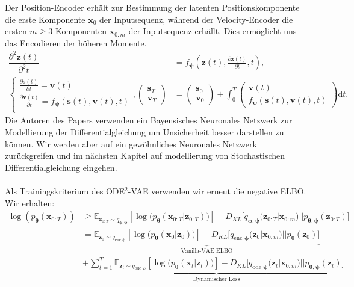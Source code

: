 \documentclass[12pt]{article}
\newcommand{\E}{\mathbb{E}}
\begin{document}
	Der Position-Encoder erhält zur Bestimmung der latenten Positionskomponente die erste Komponente $\mathbf x_{0}$ der Inputsequenz, während der Velocity-Encoder die ersten $m\geq 3$ Komponenten $\mathbf x_{0:m}$ der Inputsequenz erhällt. Dies ermöglicht uns das Encodieren der höheren Momente.
	\begin{align*}
	\dfrac{\partial^2 \mathbf{z}(t)}{\partial^2 t}&=f_{\boldsymbol{\psi}}\left(\mathbf{z}(t), \tfrac{\partial \mathbf{z}(t)}{\partial t}, t\right), \\
	\begin{cases*}
	\tfrac{\partial \mathbf{s}(t)}{\partial t}=\mathbf v(t) \\
	\tfrac{\partial \mathbf{v}(t)}{\partial t}=f_{\boldsymbol{\psi}}(\mathbf s(t), \mathbf v(t), t) \\
	\end{cases*},
	\left(\begin{array}{cc}
	\mathbf s_{T} \\
	\mathbf v_{T}
	\end{array}\right)
	&=
	\left(\begin{array}{cc}
	\mathbf s_{0} \\
	\mathbf v_{0}
	\end{array}\right)
	+
	\int_{0}^{T}
	\left(\begin{array}{cc}
	\mathbf v(t) \\
	f_{\boldsymbol{\psi}}(\mathbf s(t), \mathbf v(t), t)
	\end{array}\right)
	\mathrm{d}t.
	\end{align*}
	Die Autoren des Papers verwenden ein Bayensisches Neuronales Netzwerk zur Modellierung der Differentialgleichung um Unsicherheit besser darstellen zu können. Wir werden aber auf ein gewöhnliches Neuronales Netzwerk zurückgreifen und im nächsten Kapitel auf modellierung von Stochastischen Differentialgleichung eingehen. \\ \\
	Als Trainingskriterium des ODE$^2$-VAE verwenden wir erneut die negative ELBO.
	Wir erhalten:
	\begin{align*}
	\log\left(p_{\boldsymbol{\theta}}(\mathbf{x}_{0:T})\right)&\ge \E_{\mathbf{z}_{0:T}\sim q_{\boldsymbol\phi,\boldsymbol\psi}}
	\left[\log\big(p_{\boldsymbol\theta}\left(\mathbf{x}_{0:T}|\mathbf{z}_{0:T}\right)\big)\right] - D_{KL}\big[q_{\boldsymbol\phi,\boldsymbol\psi}(\mathbf{z}_{0:T}|\mathbf{x}_{0:m})||p_{\boldsymbol\theta,\boldsymbol\psi}(\mathbf{z}_{0:T})\big]\\
	&=\underbrace{\E_{\mathbf{z}_{0}\sim q_{\text{enc }\boldsymbol\phi}}
		\left[\log\big(p_{\boldsymbol\theta}\left(\mathbf{x}_{0}|\mathbf{z}_{0}\right)\big)\right] - D_{KL}\big[q_{\text{enc }\boldsymbol\phi}(\mathbf{z}_{0}|\mathbf{x}_{0:m})||p_{\boldsymbol\theta}(\mathbf{z}_{0})\big]}_{\text{Vanilla-VAE ELBO}}\\ &+ \underbrace{\sum_{t=1}^T \E_{\mathbf{z}_{t}\sim q_{\text{ode }\boldsymbol\psi}}
		\left[\log\big(p_{\boldsymbol\theta}\left(\mathbf{x}_{t}|\mathbf{z}_{t}\right)\big)\right] - D_{KL}\big[q_{\text{ode }\boldsymbol\psi}(\mathbf{z}_{t}|\mathbf{x}_{0:m})||p_{\boldsymbol\theta,\boldsymbol\psi}(\mathbf{z}_{t})\big]}_{\text{Dynamischer Loss}}
	\end{align*}
\end{document}
